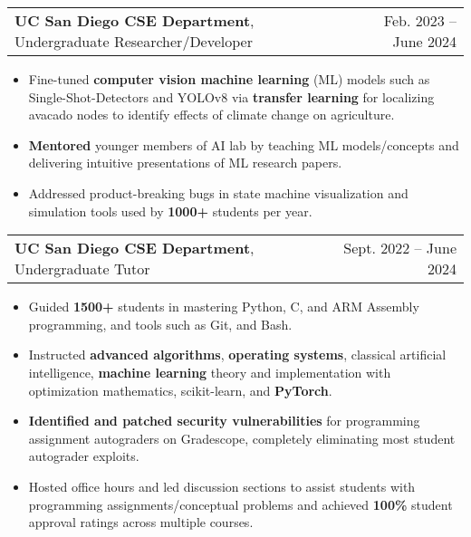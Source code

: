 \documentclass[letterpaper, 10pt]{article}
\makeatletter
\newcommand{\resumeItem}[1]{
  \item\small{
    {#1 \vspace{-2pt}}
  }
}
\newcommand{\altSubheading}[3]{
  \vspace{4pt}\item
    \begin{tabular*}{0.97\textwidth}[t]{l@{\extracolsep{\fill}}r}
      \textbf{#1}, {#2} & #3 \\
    \end{tabular*}\vspace{-7pt}
}
\newcommand{\resumeSubSubheading}[2]{
    \item
    \begin{tabular*}{0.97\textwidth}{l@{\extracolsep{\fill}}r}
      \textit{\small#1} & \textit{\small #2} \\
    \end{tabular*}\vspace{-7pt}
}
\newcommand{\resumeSubHeadingListEnd}{\end{itemize}}
\newcommand{\resumeItemListStart}{\begin{itemize}}
\newcommand{\resumeItemListEnd}{\end{itemize}\vspace{-4pt}}
\makeatother
\begin{document}
    \altSubheading
      {UC San Diego CSE Department}{Undergraduate Researcher/Developer}{Feb. 2023 -- June 2024}
      \resumeItemListStart
        \resumeItem{Fine-tuned \textbf{computer vision machine learning} (ML) models such as Single-Shot-Detectors and YOLOv8 via \textbf{transfer learning} for localizing avacado nodes to identify effects of climate change on agriculture. }
        \resumeItem{\textbf{Mentored} younger members of AI lab by teaching ML models/concepts and delivering intuitive presentations of ML research papers. }
        \resumeItem{Addressed product-breaking bugs in state machine visualization and simulation tools used by \textbf{1000+} students per year.}
    \resumeItemListEnd

    \altSubheading
    {UC San Diego CSE Department}{Undergraduate Tutor}{Sept. 2022 -- June 2024}
      \resumeItemListStart
        \resumeItem{Guided \textbf{1500+} students in mastering Python, C, and ARM Assembly programming, and tools such as Git, and Bash. }
        \resumeItem{Instructed \textbf{advanced algorithms}, \textbf{operating systems}, classical artificial intelligence, \textbf{machine learning} theory and implementation with optimization mathematics, scikit-learn, and \textbf{PyTorch}. }
        \resumeItem{\textbf{Identified and patched security vulnerabilities} for programming assignment autograders on Gradescope, completely eliminating most student autograder exploits.}
        \resumeItem{Hosted office hours and led discussion sections to assist students with programming assignments/conceptual problems and achieved \textbf{100\%} student approval ratings across multiple courses.}
      \resumeItemListEnd

\end{document}
